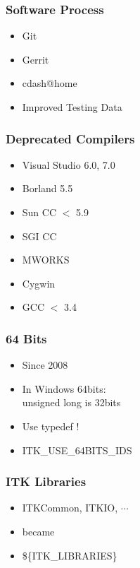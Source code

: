 \begin{frame}
\frametitle{Software Process}
\Huge
\begin{itemize}
\item Git
\pause
\item Gerrit
\pause
\item cdash@home
\pause
\item Improved Testing Data
\end{itemize}
\end{frame}




\begin{frame}
\frametitle{Deprecated Compilers}
\Huge
\begin{itemize}
\item Visual Studio 6.0, 7.0
\pause
\item Borland 5.5
\pause
\item Sun CC $<$ 5.9
\pause
\item SGI CC
\pause
\item MWORKS
\pause
\item Cygwin
\pause
\item GCC $<$ 3.4
\end{itemize}
\end{frame}





\begin{frame}
\frametitle{64 Bits}
\Huge
\begin{itemize}
\item Since 2008
\pause
\item In Windows 64bits:\\unsigned long is 32bits
\pause
\item Use typedef !
\pause
\item ITK\_USE\_64BITS\_IDS
\end{itemize}
\end{frame}


\begin{frame}
\frametitle{ITK Libraries}
\Huge
\begin{itemize}
\item ITKCommon, ITKIO, $\cdots$
\pause
\item became
\pause
\item \$\{ITK\_LIBRARIES\}
\end{itemize}
\end{frame}
